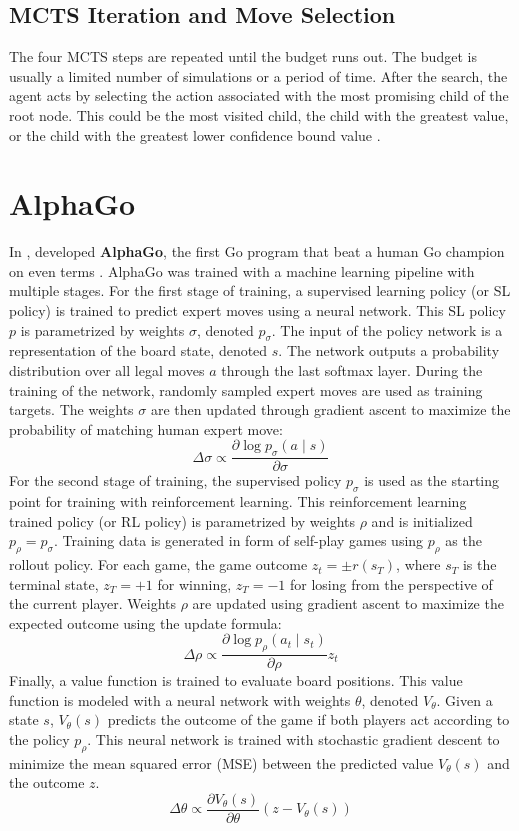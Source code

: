 \subsection{MCTS Iteration and Move Selection}
The four MCTS steps are repeated until the budget runs out.
The budget is usually a limited number of simulations or a period of time.
After the search, the agent acts by selecting the action associated with the most promising child of the root node.
This could be the most visited child, the child with the greatest value, or the child with the greatest lower confidence bound value \cite{FreshMaxLcb_RoyJonathan_2019,AcceleratingSelfPlayLearning_Wu_2020}.

\section{AlphaGo} \label{sec:alpha_go}
In \citeyear{MasteringGameGo_Silver.Schrittwieser.ea_2017},
\citeauthor{MasteringGameGo_Silver.Schrittwieser.ea_2017} developed \textbf{AlphaGo},
the first Go program that beat a human Go champion on even terms \cite{MasteringGameGo_Silver.Schrittwieser.ea_2017}.
AlphaGo was trained with a machine learning pipeline with multiple stages.
For the first stage of training, a supervised learning policy (or SL policy) is trained to predict expert moves using a neural network.
This SL policy $p$ is parametrized by weights $\sigma$, denoted $p_{\sigma}$.
The input of the policy network is a representation of the board state, denoted $s$.
The network outputs a probability distribution over all legal moves $a$ through the last softmax layer.
During the training of the network, randomly sampled expert moves are used as training targets.
The weights $\sigma$ are then updated through gradient ascent to maximize the probability of matching human expert move:
$$
    \Delta \sigma \propto \frac{\partial \log p_{\sigma}(a \mid s)}{\partial \sigma}
$$
For the second stage of training, the supervised policy $p_{\sigma}$ is used as the starting point for training with reinforcement learning.
This reinforcement learning trained policy (or RL policy) is parametrized by weights $\rho$ and is initialized $p_{\rho} = p_{\sigma}$.
Training data is generated in form of self-play games using $p_{\rho}$ as the rollout policy.
For each game, the game outcome $z_t = \pm r(s_T)$, where $s_T$ is the terminal state, $z_T = +1$ for winning, $z_T = -1$ for losing from the perspective of the current player.
Weights $\rho$ are updated using gradient ascent to maximize the expected outcome using the update formula:
$$
    \Delta \rho \propto \frac{\partial \log p_{\rho}\left(a_{t} \mid s_{t}\right)}{\partial \rho} z_{t}
$$
Finally, a value function is trained to evaluate board positions.
This value function is modeled with a neural network with weights $\theta$, denoted $V_{\theta}$.
Given a state $s$, $V_{\theta}(s)$ predicts the outcome of the game if both players act according to the policy $p_{\rho}$.
This neural network is trained with stochastic gradient descent to minimize the mean squared error (MSE) between the predicted value $V_{\theta}(s)$ and the outcome $z$.
$$
    \Delta \theta \propto \frac{\partial V_{\theta}(s)}{\partial \theta}\left(z-V_{\theta}(s)\right)
$$

